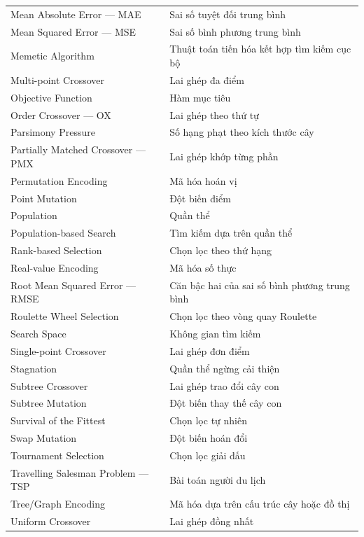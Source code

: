 \begin{longtable}{p{7.1cm}p{7.1cm}}
Mean Absolute Error --- MAE         & Sai số tuyệt đối trung bình \\
Mean Squared Error --- MSE          & Sai số bình phương trung bình \\
Memetic Algorithm                   & Thuật toán tiến hóa kết hợp tìm kiếm cục bộ \\
Multi-point Crossover               & Lai ghép đa điểm \\
Objective Function                  & Hàm mục tiêu \\
Order Crossover --- OX              & Lai ghép theo thứ tự \\
Parsimony Pressure                  & Số hạng phạt theo kích thước cây \\
Partially Matched Crossover --- PMX & Lai ghép khớp từng phần \\
Permutation Encoding                & Mã hóa hoán vị \\
Point Mutation                      & Đột biến điểm \\
Population                          & Quần thể \\
Population-based Search             & Tìm kiếm dựa trên quần thể \\
Rank-based Selection                & Chọn lọc theo thứ hạng \\
Real-value Encoding                 & Mã hóa số thực \\
Root Mean Squared Error --- RMSE    & Căn bậc hai của sai số bình phương trung bình \\
Roulette Wheel Selection            & Chọn lọc theo vòng quay Roulette \\
Search Space                        & Không gian tìm kiếm \\
Single-point Crossover              & Lai ghép đơn điểm \\
Stagnation                          & Quần thể ngừng cải thiện \\
Subtree Crossover                   & Lai ghép trao đổi cây con \\
Subtree Mutation                    & Đột biến thay thế cây con \\
Survival of the Fittest             & Chọn lọc tự nhiên \\
Swap Mutation                       & Đột biến hoán đổi \\
Tournament Selection                & Chọn lọc giải đấu \\
Travelling Salesman Problem --- TSP & Bài toán người du lịch \\
Tree/Graph Encoding                 & Mã hóa dựa trên cấu trúc cây hoặc đồ thị \\
Uniform Crossover                   & Lai ghép đồng nhất \\
\bottomrule
\end{longtable}
